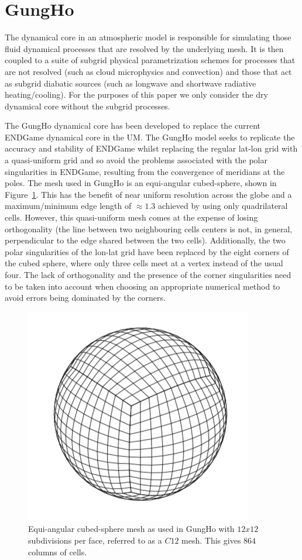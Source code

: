 \documentclass[review,times]{elsarticle}
\begin{document}
\section{\label{sec:GH}GungHo}

The dynamical core in an atmospheric model is responsible for
simulating those fluid dynamical processes that are resolved by the
underlying mesh. It is then coupled to a suite of subgrid physical
parametrization schemes for processes that are not resolved (such as
cloud microphysics and convection) and those that act as subgrid
diabatic sources (such as longwave and shortwave radiative
heating/cooling). For the purposes of this paper we only consider
the dry dynamical core without the subgrid processes.

The GungHo dynamical core has been developed to replace the current ENDGame
dynamical core in the UM. The GungHo model seeks to replicate the
accuracy and stability of ENDGame whilst replacing the regular lat-lon
grid with a quasi-uniform grid and so avoid the problems associated
with the polar singularities in ENDGame, resulting from the
convergence of meridians at the poles. The mesh used in GungHo is an
equi-angular cubed-sphere, shown in Figure~\ref{fig:cubed-sphere}.
This has the benefit of near uniform resolution across the globe and a
maximum/minimum edge length of $\approx 1.3$ achieved by using only
quadrilateral cells.  However, this quasi-uniform mesh comes at the
expense of losing orthogonality (the line between two neighbouring
cells centers is not, in general, perpendicular to the edge shared
between the two cells). Additionally, the two polar singularities of
the lon-lat grid have been replaced by the eight corners of
the cubed sphere, where only three cells meet at a vertex instead of
the usual four. The lack of orthogonality and the presence of the
corner singularities need to be taken into account when choosing an
appropriate numerical method to avoid errors being dominated by the
corners.
%
\begin{figure}
\centering\includegraphics[width=0.6\linewidth]{Fig1_Cubed_Sphere.png}
\caption{\label{fig:cubed-sphere} Equi-angular cubed-sphere mesh as
used in GungHo with $12x12$ subdivisions per face, 
referred to as a $C12$ mesh. This gives $864$ columns of cells.}
\end{figure}
%
\end{document}
